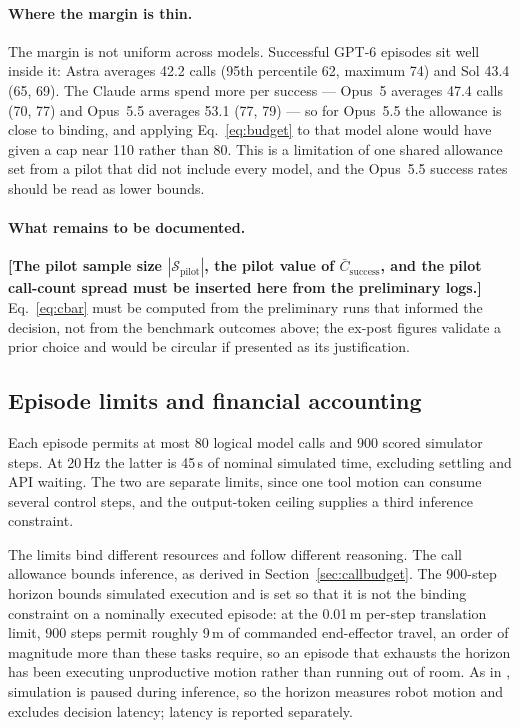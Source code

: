 \documentclass[11pt]{article}
\newcommand{\placeholder}[1]{\textbf{[#1]}}
\begin{document}
\paragraph{Where the margin is thin.}
The margin is not uniform across models. Successful GPT-6 episodes sit well
inside it: Astra averages 42.2 calls (95th percentile 62, maximum 74) and Sol
43.4 (65, 69). The Claude arms spend more per success --- Opus~5 averages 47.4
calls (70, 77) and Opus~5.5 averages 53.1 (77, 79) --- so for Opus~5.5 the
allowance is close to binding, and applying Eq.~\eqref{eq:budget} to that model
alone would have given a cap near 110 rather than 80. This is a limitation of
one shared allowance set from a pilot that did not include every model, and the
Opus~5.5 success rates should be read as lower bounds.

\paragraph{What remains to be documented.}
\placeholder{The pilot sample size $|\mathcal{S}_{\mathrm{pilot}}|$, the pilot
value of $\bar C_{\mathrm{success}}$, and the pilot call-count spread must be
inserted here from the preliminary logs.} Eq.~\eqref{eq:cbar} must be computed
from the preliminary runs that informed the decision, not from the benchmark
outcomes above; the ex-post figures validate a prior choice and would be
circular if presented as its justification.

\subsection{Episode limits and financial accounting}
Each episode permits at most 80 logical model calls and 900 scored simulator
steps. At 20\,Hz the latter is 45\,s of nominal simulated time, excluding
settling and API waiting. The two are separate limits, since one tool motion
can consume several control steps, and the output-token ceiling supplies a
third inference constraint.

The limits bind different resources and follow different reasoning. The call
allowance bounds inference, as derived in Section~\ref{sec:callbudget}. The
900-step horizon bounds simulated execution and is set so that it is not the
binding constraint on a nominally executed episode: at the 0.01\,m per-step
translation limit, 900 steps permit roughly 9\,m of commanded end-effector
travel, an order of magnitude more than these tasks require, so an episode that
exhausts the horizon has been executing unproductive motion rather than running
out of room. As in \citet{galbot2026astra}, simulation is paused during
inference, so the horizon measures robot motion and excludes decision latency;
latency is reported separately.
\end{document}
